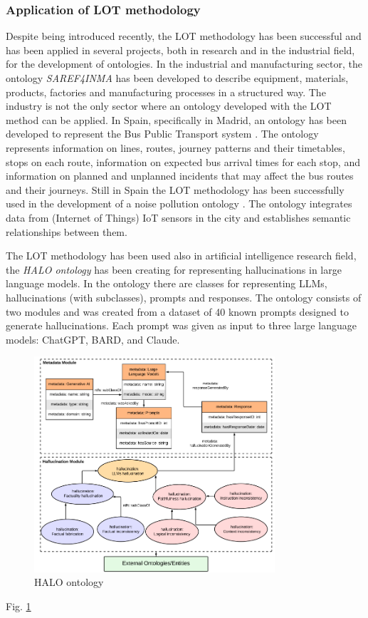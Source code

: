 \subsubsection{Application of LOT methodology}
Despite being introduced recently, the LOT methodology has been successful and has been applied in several projects, both in research and in the industrial field, for the development of ontologies.
In the industrial and manufacturing sector, the ontology \textit{SAREF4INMA} \cite{de2020saref4inma} has been developed to describe equipment, materials, products, factories and manufacturing processes in a structured way. 
The industry is not the only sector where an ontology developed with the LOT method can be applied.
In Spain, specifically in Madrid, an ontology has been developed to represent the Bus Public Transport system \cite{ruckhaus2023applying}. 
The ontology represents information on lines, routes, journey patterns and their timetables, stops on each route, information on expected bus arrival times for each stop, and information on planned and unplanned incidents that may affect the bus routes and their journeys.
Still in Spain the LOT methodology has been successfully used in the development of a noise pollution ontology \cite{espinoza2020using}.
The ontology integrates data from (Internet of Things) IoT sensors in the city and establishes semantic relationships between them. 

The LOT methodology has been used also in artificial intelligence research field, the \textit{HALO ontology} \cite{nananukul2024halo} has been creating for representing hallucinations in large language models.
In the ontology there are classes for representing LLMs, hallucinations (with subclasses), prompts and responses.
The ontology consists of two modules and was created from a dataset of 40 known prompts designed to generate hallucinations. Each prompt was given as input to three large language models: ChatGPT, BARD, and Claude.
\begin{figure}[H]
    \centering
    \includegraphics[width=0.7\linewidth, height=8cm]{Figures/fig_4.png}
    \caption{HALO ontology}
    \label{fig:halo}
\end{figure}
Fig. \ref{fig:halo}

